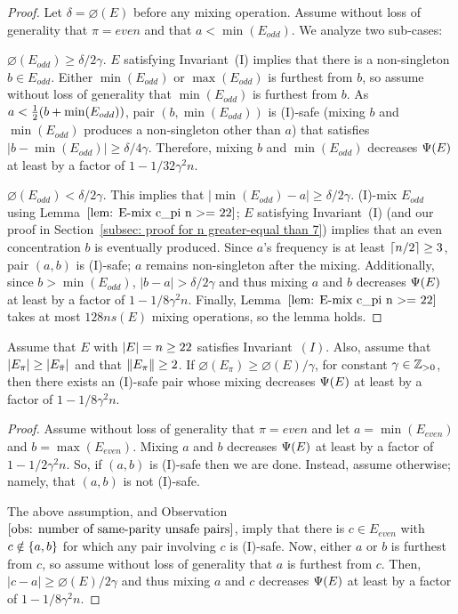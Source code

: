 \begin{proof}
	Let $\delta=\diameter(E)$ before any mixing operation.
	Assume without loss of generality that $\pi=even$ and that $a<\min(E_{odd})$.
	We analyze two sub-cases:
	
	\medskip\noindent{} $\diameter(E_{odd})\geq\delta/2\gamma$.
	$E$ satisfying Invariant~(I) implies that there is a non-singleton $b\in E_{odd}$.
	Either $\min(E_{odd})$ or $\max(E_{odd})$ is furthest from $b$, so
	assume without loss of generality that $\min(E_{odd})$ is furthest from $b$.
	As $a<{\textstyle\frac{1}{2}}(b+\min(E_{odd}))$, pair $(b,\min(E_{odd}))$ is (I)-safe 
	(mixing $b$ and $\min(E_{odd})$	produces a non-singleton other than $a$)
	that satisfies $|b-\min(E_{odd})|\geq\delta/4\gamma$.
	Therefore, mixing $b$ and $\min(E_{odd})$ decreases ${\Psi}(E)$ 
	at least by a factor of $1-1/32\gamma^2n$.
	
	\medskip\noindent{} $\diameter(E_{odd})<\delta/2\gamma$.
	This implies that $|\min(E_{odd})-a|\geq\delta/2\gamma$.
	(I)-mix $E_{odd}$ using Lemma~$\ref{lem: E-mix c_pi n >= 22}$;
	$E$ satisfying Invariant~(I) (and our proof in 
	Section~\ref{subsec: proof for n greater-equal than 7}) 
	implies that an even concentration $b$ is eventually produced.
	Since $a$'s frequency is at least $\lceil n/2\rceil\geq 3$, pair $(a,b)$ is (I)-safe;
	$a$ remains non-singleton after the mixing.
	Additionally, since $b > \min(E_{odd})$, $|b-a|>\delta/2\gamma$ and thus
	mixing $a$ and $b$ decreases ${\Psi}(E)$ at least by a factor of $1-1/8\gamma^2n$.
	Finally, Lemma~$\ref{lem: E-mix c_pi n >= 22}$ takes at most 
	$128ns(E)$ mixing operations, so the lemma holds.
\end{proof}


\begin{lemma}\label{lem: far mix in E even}
	Assume that $E$ with ${|E|}=n\geq 22$ satisfies Invariant~$(I)$.
	Also, assume that ${|E_{\pi}|}\geq{|E_{\bar{\pi}}|}$
	and that ${\|E_{\pi}\|}\geq 2$.
	If $\diameter(E_\pi) \geq \diameter(E)/\gamma$, for constant $\gamma\in{\mathbb{Z}_{> 0}}$, 
	then there exists an (I)-safe pair whose mixing decreases ${\Psi}(E)$ 
	at least by a factor of $1-1/8\gamma^2n$.
\end{lemma}

\begin{proof}
	Assume without loss of generality that $\pi=even$ and let $a=\min(E_{even})$ and $b=\max(E_{even})$.
	Mixing $a$ and $b$ decreases ${\Psi}(E)$ at least by a factor of $1-1/2\gamma^2n$.
	So, if $(a,b)$ is (I)-safe then we are done.
	Instead, assume otherwise; namely, that $(a,b)$ is not (I)-safe.
	
	The above assumption, and Observation~$\ref{obs: number of same-parity unsafe pairs}$,
	imply that there is $c\in E_{even}$ with $c\notin{ \left\{ a,b \right\} }$ 
	for which any pair involving $c$ is (I)-safe.
	Now, either $a$ or $b$ is furthest from $c$, so	assume without loss of generality 
	that $a$ is furthest from $c$.
	Then, $|c-a|\geq\diameter(E)/2\gamma$ and thus mixing $a$ and $c$ decreases 
	${\Psi}(E)$ at least by a factor of $1-1/8\gamma^2n$.
\end{proof}

